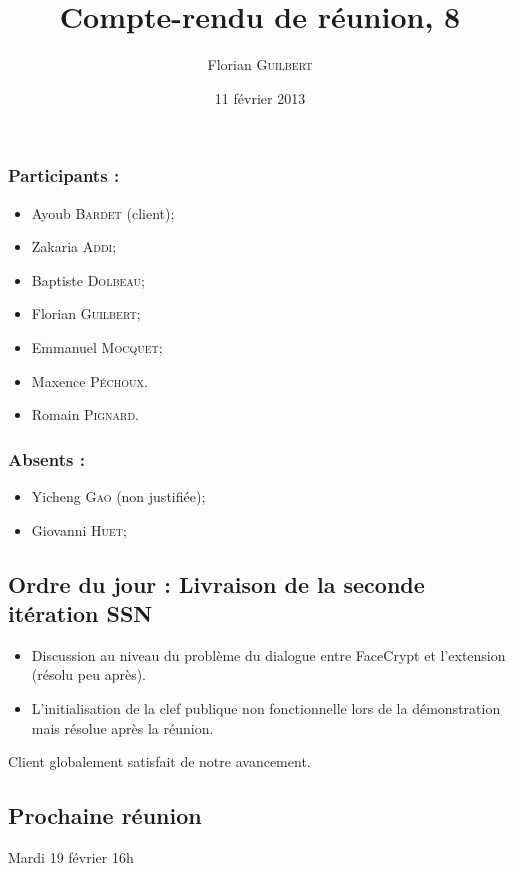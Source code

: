 \documentclass[a4paper,10pt]{article}
\author{Florian \textsc{Guilbert}}
\title{Compte-rendu de réunion, 8}
\date{11 février 2013}
\begin{document}
\maketitle

\subsubsection*{Participants : }
\begin{itemize}
    \item Ayoub \textsc{Bardet} (client);
    \item Zakaria \textsc{Addi};
    \item Baptiste \textsc{Dolbeau};
    \item Florian \textsc{Guilbert};
    \item Emmanuel \textsc{Mocquet};
    \item Maxence  \textsc{Péchoux}.
    \item Romain \textsc{Pignard}.
\end{itemize}

\subsubsection*{Absents : }
\begin{itemize}
    \item Yicheng \textsc{Gao} (non justifiée);
    \item Giovanni \textsc{Huet};
\end{itemize}

\subsection*{Ordre du jour : Livraison de la seconde itération SSN}

\begin{itemize}
\item Discussion au niveau du problème du dialogue entre FaceCrypt et l'extension
(résolu peu après).
\item L'initialisation de la clef publique non fonctionnelle lors de la 
démonstration mais résolue après la réunion.
\end{itemize}

Client globalement satisfait de notre avancement.

\subsection*{Prochaine réunion}
    Mardi 19 février 16h
    
\end{document}
